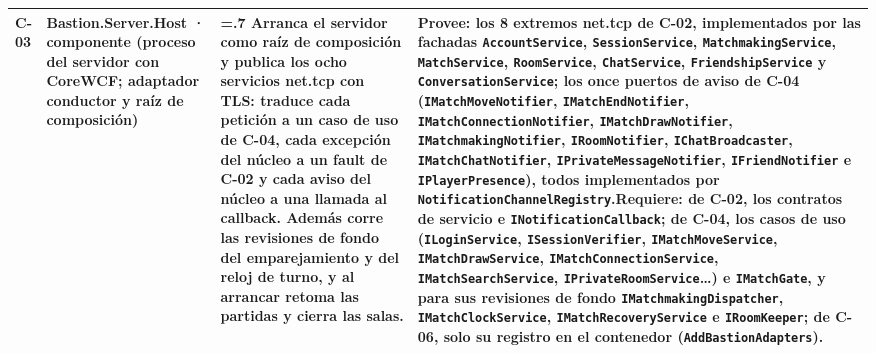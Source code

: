 \documentclass[11pt,letterpaper]{article}
\begin{document}
\begin{xltabular}{\linewidth}{|p{1.4cm}|>{\raggedright\arraybackslash}p{3.6cm}|>{\hsize=.7\hsize}Y|>{\hsize}Y|}
  C-03 & Bastion.Server.Host · componente (proceso del servidor con CoreWCF; adaptador conductor y raíz de composición) & Arranca el servidor como raíz de composición y publica los ocho servicios net.tcp con TLS: traduce cada petición a un caso de uso de C-04, cada excepción del núcleo a un fault de C-02 y cada aviso del núcleo a una llamada al callback. Además corre las revisiones de fondo del emparejamiento y del reloj de turno, y al arrancar retoma las partidas y cierra las salas. & \textbf{Provee:} los 8 extremos net.tcp de C-02, implementados por las fachadas \texttt{AccountService}, \texttt{SessionService}, \texttt{MatchmakingService}, \texttt{MatchService}, \texttt{RoomService}, \texttt{ChatService}, \texttt{FriendshipService} y \texttt{ConversationService}; los once puertos de aviso de C-04 (\texttt{IMatchMoveNotifier}, \texttt{IMatchEndNotifier}, \texttt{IMatchConnectionNotifier}, \texttt{IMatchDrawNotifier}, \texttt{IMatchmakingNotifier}, \texttt{IRoomNotifier}, \texttt{IChatBroadcaster}, \texttt{IMatchChatNotifier}, \texttt{IPrivateMessageNotifier}, \texttt{IFriendNotifier} e \texttt{IPlayerPresence}), todos implementados por \texttt{NotificationChannelRegistry}.\newline\textbf{Requiere:} de C-02, los contratos de servicio e \texttt{INotificationCallback}; de C-04, los casos de uso (\texttt{ILoginService}, \texttt{ISessionVerifier}, \texttt{IMatchMoveService}, \texttt{IMatchDrawService}, \texttt{IMatchConnectionService}, \texttt{IMatchSearchService}, \texttt{IPrivateRoomService}…) e \texttt{IMatchGate}, y para sus revisiones de fondo \texttt{IMatchmakingDispatcher}, \texttt{IMatchClockService}, \texttt{IMatchRecoveryService} e \texttt{IRoomKeeper}; de C-06, solo su registro en el contenedor (\texttt{AddBastionAdapters}).\\\hline

\end{xltabular}
\end{document}
